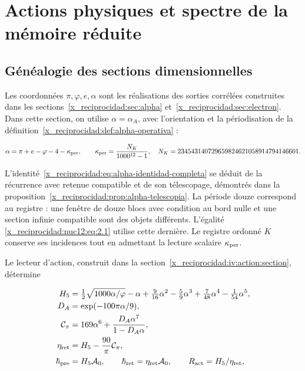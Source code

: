 \chapter{Actions physiques et spectre de la mémoire réduite}
\label{x_reciprocidad:nuclear:12}
\section{Généalogie des sections dimensionnelles}

Les coordonnées \(\pi,\varphi,e,\alpha\) sont les réalisations des sorties corrélées construites dans les sections~\ref{x_reciprocidad:sec:alpha} et~\ref{x_reciprocidad:sec:electron}. Dans cette section, on utilise \(\alpha=\alpha_A\), avec l’orientation et la périodisation de la définition~\ref{x_reciprocidad:def:alpha-operativa} :



\begin{equation}
\alpha=\pi+e-\varphi-4-\kappa_{\rm per},\qquad
\kappa_{\rm per}=\frac{N_K}{1000^{12}-1},
\quad N_K=234543140729659824621058914794146601.
\label{x_reciprocidad:nuc12:eq:2.1}
\end{equation}



L’identité~\eqref{x_reciprocidad:eq:alpha-identidad-completa} se déduit de la récurrence avec retenue compatible et de son télescopage, démontrés dans la proposition~\ref{x_reciprocidad:prop:alpha-telescopia}. La période douze correspond au registre : une fenêtre de douze blocs avec condition au bord nulle et une section infinie compatible sont des objets différents. L’égalité \eqref{x_reciprocidad:nuc12:eq:2.1} utilise cette dernière. Le registre ordonné \(K\) conserve ses incidences tout en admettant la lecture scalaire \(\kappa_{\rm per}\).

Le lecteur d’action, construit dans la section~\ref{x_reciprocidad:iv:action:section}, détermine



\begin{equation}
\begin{aligned}
H_5&=\tfrac12\sqrt{1000\alpha/\varphi}-\alpha+
\tfrac9{16}\alpha^2-\tfrac59\alpha^3+
\tfrac7{48}\alpha^4-\tfrac1{54}\alpha^5,\\
D_A&=\exp(-100\pi\alpha/9),\\
\mathcal C_\pi&=169\alpha^6+\frac{D_A\alpha^7}{1-D_A\alpha},\\
\eta_{\rm ret}&=H_5-\frac{90}{\pi}\mathcal C_\pi,\\
\hbar_{\rm pre}&=H_5\mathcal A_0,\qquad
\hbar_{\rm ret}=\eta_{\rm ret}\mathcal A_0,\qquad
R_{\rm act}=H_5/\eta_{\rm ret},
\end{aligned}
\label{x_reciprocidad:nuc12:eq:2.2}
\end{equation}




